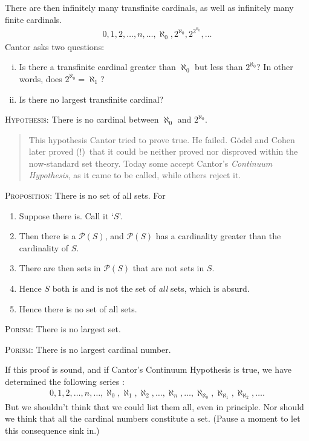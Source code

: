 \documentclass[twoside,openright]{article}
\begin{document}
\begin{enumerate}
  There are then infinitely many transfinite cardinals, as well as
  infinitely many finite cardinals.
  \begin{align*}
    0,1,2,\dotsc,n,\dotsc,\aleph_0,2^{\aleph_0},2^{2^{\aleph_0}},\dotsc
  \end{align*}
  Cantor asks two questions:
  \begin{enumerate}[(i)]
  \item Is there a transfinite cardinal greater than $\aleph_0$ but
    less than $2^{\aleph_0}$? In other words, does
    $2^{\aleph_0}=\aleph_1$?
  \item Is there no largest transfinite cardinal?
  \end{enumerate}
  \textsc{Hypothesis}: There is no cardinal between $\aleph_0$ and
  $2^{\aleph_0}$. \label{continuumhyp}
  \begin{quote}
    \small{This hypothesis Cantor tried to prove true. He
      failed. G\"{o}del and Cohen later proved (!)\ that it could be
      neither proved nor disproved within the now-standard set
      theory. Today some accept Cantor's \emph{Continuum Hypothesis},
      as it came to be called, while others reject it.}
  \end{quote}
  \textsc{Proposition}: There is no set of all
  sets. \label{nosetallsets} For
  \begin{enumerate}[(1)]
  \item Suppose there is. Call it `$S$'.
  \item Then there is a $\mathscr{P}(S)$, and $\mathscr{P}(S)$ has a
    cardinality greater than the cardinality of $S$.
  \item There are then sets in $\mathscr{P}(S)$ that are not sets in
    $S$.
  \item Hence $S$ both is and is not the set of \emph{all} sets, which
    is absurd.
  \item Hence there is no set of all sets.
  \end{enumerate}
  \textsc{Porism}: There is no largest set.

  \textsc{Porism}: There is no largest cardinal number.

  If this proof is sound, and if Cantor's Continuum Hypothesis is
  true, we have determined the following
  series \label{seriescardinals}:
  \begin{align*}
    0,1,2,\dotsc,n,\dotsc,\aleph_0,\aleph_1,\aleph_2,\dotsc,\aleph_n,
    \dotsc, \aleph_{\aleph_0},
    \aleph_{\aleph_1},\aleph_{\aleph_2},\ldots. 
  \end{align*}
  But we shouldn't think that we could list them all, even in
  principle. Nor should we think that all the cardinal numbers
  constitute a set. (Pause a moment to let this consequence sink in.)


\end{enumerate}
\end{document}
